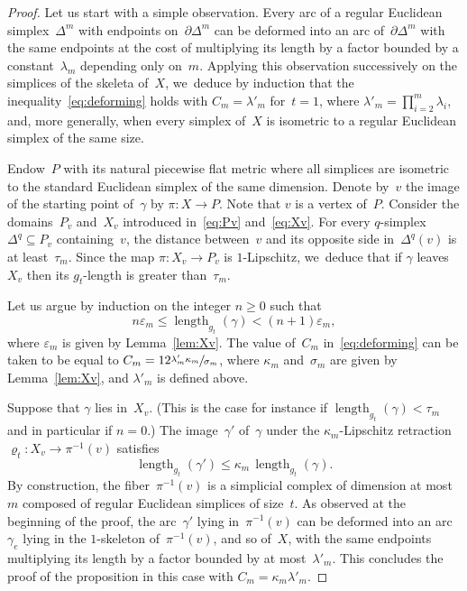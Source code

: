\documentclass[11pt]{article}
\let\oldsfrac\sfrac
\renewcommand{\sfrac}[2]{{\oldsfrac{#1}{#2}}}
\theoremstyle{definition}
\DeclareMathOperator{\length}{length}
\numberwithin{equation}{section}
\begin{document}
\begin{proof}
Let us start with a simple observation.
Every arc of a regular Euclidean simplex~$\Delta^m$ with endpoints on~$\partial \Delta^m$ can be deformed into an arc of~$\partial \Delta^m$ with the same endpoints at the cost of multiplying its length by a factor bounded by a constant~$\lambda_m$ depending only on~$m$.
Applying this observation successively on the simplices of the skeleta of~$X$, we~deduce by induction that the inequality~\eqref{eq:deforming} holds with $C_m = \lambda'_m$ for~$t=1$, where $\lambda'_m = \prod_{i=2}^m \lambda_i$, and, more generally, when every simplex of~$X$ is isometric to a regular Euclidean simplex of the same size.

Endow~$P$ with its natural piecewise flat metric where all simplices are isometric to the standard Euclidean simplex of the same dimension.
Denote by~$v$ the image of the starting point of~$\gamma$ by $\pi:X \to P$.
Note that $v$ is a vertex of~$P$.
Consider the domains~$P_v$ and~$X_v$ introduced in~\eqref{eq:Pv} and~\eqref{eq:Xv}.
For every $q$-simplex $\Delta^q \subseteq P_v$ containing~$v$, the distance between~$v$ and its opposite side in~$\Delta^q(v)$ is at least~$\tau_m$.
Since the map $\pi:X_v \to P_v$ is $1$-Lipschitz, we~deduce that if $\gamma$ leaves~$X_v$ then its $g_t$-length is greater than~$\tau_m$.

Let us argue by induction on the integer $n \geq 0$ such that
\[
n \varepsilon_m \leq \length_{g_t}(\gamma) < (n+1) \varepsilon_m,
\]
where $\varepsilon_m$ is given by Lemma~\ref{lem:Xv}.
The value of~$C_m$ in~\eqref{eq:deforming} can be taken to be equal to
$
C_m = 12 \sfrac{\lambda'_m \kappa_m}{\sigma_m}
$,
where $\kappa_m$ and~$\sigma_m$ are given by Lemma~\ref{lem:Xv}, and $\lambda'_m$ is defined above.

Suppose that $\gamma$ lies in~$X_v$.
(This is the case for instance if $\length_{g_t}(\gamma) < \tau_m$ and in particular if $n=0$.)
The image~$\gamma'$ of~$\gamma$ under the $\kappa_m$-Lipschitz retraction $\varrho_t:X_v \to \pi^{-1}(v)$ satisfies
\[
\length_{g_t}(\gamma') \leq \kappa_m \, \length_{g_t}(\gamma).
\]
By construction, the fiber~$\pi^{-1}(v)$ is a simplicial complex of dimension at most~$m$ composed of regular Euclidean simplices of size~$t$.
As observed at the beginning of the proof, the arc~$\gamma'$ lying in~$\pi^{-1}(v)$ can be deformed into an arc~$\gamma_e$ lying in the $1$-skeleton of~$\pi^{-1}(v)$, and so of~$X$, with the same endpoints multiplying its length by a factor bounded by at most~$\lambda'_m$.
This concludes the proof of the proposition in this case with $C_m=\kappa_m \lambda'_m$.


\end{proof}
\end{document}
